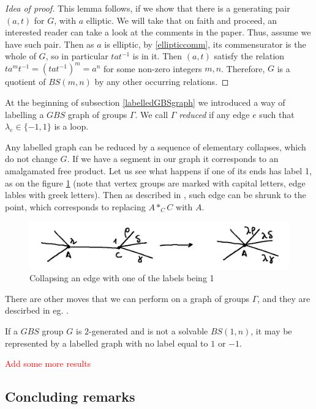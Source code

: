 \begin{proof}[Idea of proof]
 This lemma follows, if we show that there is a generating pair $(a,t)$ for $G$, with $a$ elliptic. We will take that on faith and proceed, an interested reader can take a look at the comments in the paper. Thus, assume we have such pair. Then as $a$ is elliptic, by \ref{ellipticcomm}, its commensurator is the whole of $G$, so in particular $tat^{-1}$ is in it. Then $(a,t)$ satisfy the relation $ta^mt^{-1} = (tat^{-1})^m = a^n$ for some non-zero integers $m,n$. Therefore, $G$ is a quotient of $BS(m,n)$ by any other occurring relations.
\end{proof}

\begin{definition}
    At the beginning of subsection \ref{labelledGBSgraph} we introduced a way of labelling a $GBS$ graph of groups $\Gamma$. We call $\Gamma$ \emph{reduced} if any edge $e$ such that $\lambda_e \in \{-1,1\}$ is a loop.
\end{definition}

\begin{remark}
    Any labelled graph can be reduced by a sequence of elementary collapses, which do not change $G$. If we have a segment in our graph it corresponds to an amalgamated free product. Let us see what happens if one of its ends has label 1, as on the figure \ref{collapsingedge} (note that vertex groups are marked with capital letters, edge lables with greek letters). Then as described in \cite{For06}, such edge can be shrunk to the point, which corresponds to replacing $A \ast_C C$ with $A$. 
\end{remark}

\begin{figure}[h]
    \centering
    \includegraphics[scale=0.15]{sections/alicja/collapse move.jpeg}
    \caption{Collapsing an edge with one of the labels being 1}
    \label{collapsingedge}
\end{figure}

\begin{remark}
    There are other moves that we can perform on a graph of groups $\Gamma$, and they are descirbed in eg. \cite{For06}.
\end{remark}

\begin{lemma}\cite[Lemma 2.8]{Le15}
    If a $GBS$ group $G$ is $2$-generated and is not a solvable $BS(1,n)$, it may be represented by a labelled graph with no label equal to $1$ or $-1$.
\end{lemma}

\textcolor{red}{Add some more results}






\subsection{Concluding remarks}





